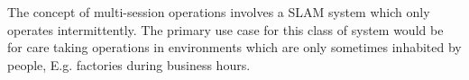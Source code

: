 
The concept of multi-session operations involves a SLAM system which only operates intermittently. The primary use case for this class of system would be for care taking operations in environments which are only sometimes inhabited by people, E.g. factories during business hours.


